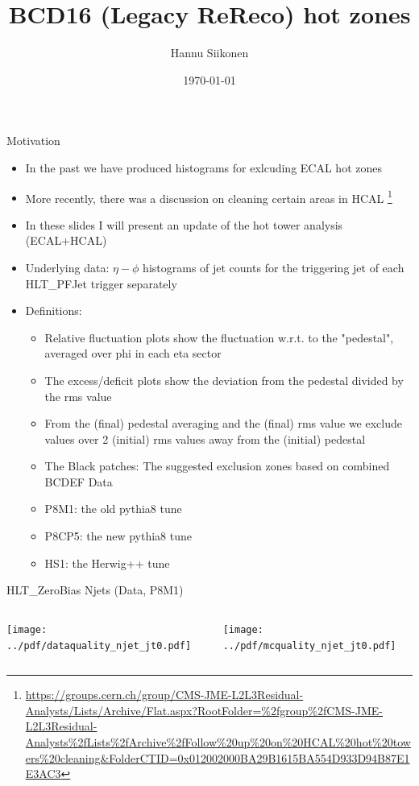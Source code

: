 \documentclass[9pt]{beamer}
\title[BCD16 (Legacy ReReco) hot zones]{BCD16 (Legacy ReReco) hot zones}
\author{Hannu Siikonen}
\institute{Helsinki Institute of Physics \\ \vspace{0.25cm} Instructor Adj.~Prof.~Mikko~Voutilainen}
\date{\today}
\begin{document}
\begin{frame}[t]
\titlepage
\end{frame}

\begin{frame}[t]{Motivation}
\begin{itemize}
 \item In the past we have produced histograms for exlcuding ECAL hot zones
 \item More recently, there was a discussion on cleaning certain areas in HCAL \footnote{\url{https://groups.cern.ch/group/CMS-JME-L2L3Residual-Analysts/Lists/Archive/Flat.aspx?RootFolder=\%2fgroup\%2fCMS-JME-L2L3Residual-Analysts\%2fLists\%2fArchive\%2fFollow\%20up\%20on\%20HCAL\%20hot\%20towers\%20cleaning&FolderCTID=0x012002000BA29B1615BA554D933D94B87E1E3AC3}}
 \item In these slides I will present an update of the hot tower analysis (ECAL+HCAL)
 \item Underlying data: $\eta - \phi$ histograms of jet counts for the triggering jet of each HLT\_PFJet\* trigger separately
 \item Definitions:
 \begin{itemize}
 \item Relative fluctuation plots show the fluctuation w.r.t. to the "pedestal", averaged over phi in each eta sector
 \item The excess/deficit plots show the deviation from the pedestal divided by the rms value
 \item From the (final) pedestal averaging and the (final) rms value we exclude values over 2 (initial) rms values away from the (initial) pedestal
 \item The Black patches: The suggested exclusion zones based on combined BCDEF Data
 \item P8M1: the old pythia8 tune
 \item P8CP5: the new pythia8 tune
 \item HS1: the Herwig++ tune
 \end{itemize}
\end{itemize}
\end{frame}

\begin{frame}[t]{HLT\_ZeroBias Njets (Data, P8M1)}
\begin{columns}[T]
  \begin{column}{.5\textwidth}
  \texttt{[image: ../pdf/dataquality\_njet\_jt0.pdf]}
  \end{column}
  \begin{column}{.5\textwidth}
  \texttt{[image: ../pdf/mcquality\_njet\_jt0.pdf]}
  \end{column}
\end{columns}
\end{frame}
\end{document}
